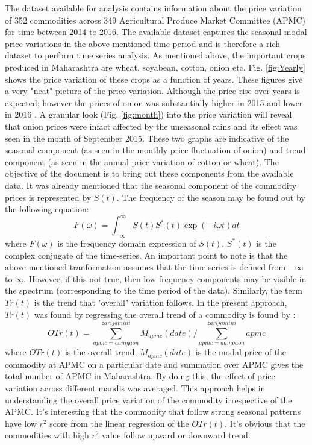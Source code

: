 \documentclass{article}
\begin{document}
The dataset available for analysis contains information about the price variation of 352 commodities across 349 Agricultural Produce Market Committee (APMC) for time between 2014 to 2016. The available dataset captures the seasonal modal price variations in the above mentioned time period and is therefore a rich dataset to perform time series analysis. As mentioned above, the important crops produced in Maharashtra are wheat, soyabean, cotton, onion etc. Fig. \ref{fig:Yearly} shows the price variation of these crops as a function of years. These figures give a very "neat" picture of the price variation. Although the price rise over years is expected; however the prices of onion was substantially higher in 2015 and  lower in 2016 . A granular look (Fig. \ref{fig:month}) into the price variation will reveal that onion prices were infact affected by the unseasonal rains and its effect was seen in the month of September 2015. These two graphs are indicative of the seasonal component (as seen in the monthly price fluctuation of onion) and trend component (as seen in the annual price variation of cotton or wheat). The objective of the document is to bring out these components from the available data. It was already mentioned that the seasonal component of the commodity prices is represented by $S(t)$. The frequency of the season may be found out by the following equation:
\begin{equation}
 F(\omega) = \int_{-\infty}^{\infty}S(t)S^*(t)\exp(-i\omega t)dt
\end{equation}
where $F(\omega)$ is the frequency domain expression of $S(t)$, $S^*(t)$ is the complex conjugate of the time-series. An important point to note is that the above mentioned tranformation assumes that the time-series is defined from $-\infty $ to $\infty$. However, if this not true, then low frequency components may be visible in the spectrum (corresponding to the time period of the data). Similarly, the term $Tr(t)$ is the trend that "overall" variation follows. In the present approach, $Tr(t)$ was found by regressing the overall trend of a commodity is found by :
\begin{equation}
OTr(t) = \sum_{apmc=aamgaon}^{zarijamini} M_{apmc}(date)/\sum_{apmc=aamgaon}^{zarijamini}apmc
\end{equation}
where $OTr(t)$ is the overall trend, $M_{apmc}(date)$ is the modal price of the commodity at APMC on a particular date and summation over APMC gives the total number of APMC in Maharashtra. By doing this, the effect of price variation across different mandis was averaged. This approach helps in understanding the overall price variation of the commodity irrespective of the APMC. It's interesting that the commodity that follow strong seasonal patterns have low $r^2$ score from the linear regression of the $OTr(t)$. It's obvious that the commodities with high $r^2$ value follow upward or downward trend.  \par
\end{document}
